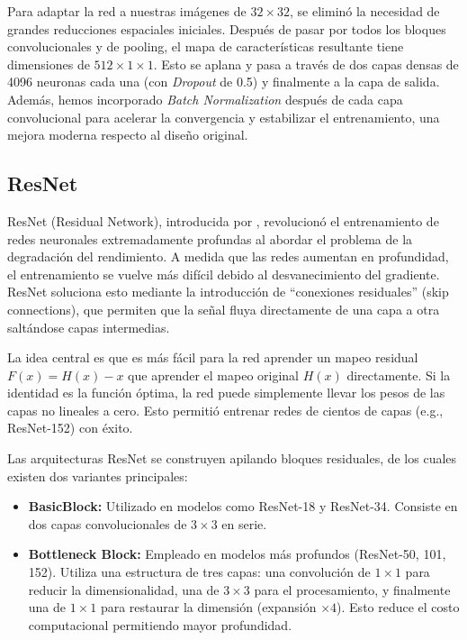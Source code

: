 \documentclass{pas}
\begin{document}
Para adaptar la red a nuestras imágenes de $32 \times 32$, se eliminó la necesidad de grandes reducciones espaciales iniciales. Después de pasar por todos los bloques convolucionales y de pooling, el mapa de características resultante tiene dimensiones de $512 \times 1 \times 1$. Esto se aplana y pasa a través de dos capas densas de 4096 neuronas cada una (con \textit{Dropout} de 0.5) y finalmente a la capa de salida. Además, hemos incorporado \textit{Batch Normalization} después de cada capa convolucional para acelerar la convergencia y estabilizar el entrenamiento, una mejora moderna respecto al diseño original.

\subsection{ResNet}

ResNet (Residual Network), introducida por \cite{he2016deep}, revolucionó el entrenamiento de redes neuronales extremadamente profundas al abordar el problema de la degradación del rendimiento. A medida que las redes aumentan en profundidad, el entrenamiento se vuelve más difícil debido al desvanecimiento del gradiente. ResNet soluciona esto mediante la introducción de ``conexiones residuales'' (skip connections), que permiten que la señal fluya directamente de una capa a otra saltándose capas intermedias.

La idea central es que es más fácil para la red aprender un mapeo residual $F(x) = H(x) - x$ que aprender el mapeo original $H(x)$ directamente. Si la identidad es la función óptima, la red puede simplemente llevar los pesos de las capas no lineales a cero. Esto permitió entrenar redes de cientos de capas (e.g., ResNet-152) con éxito.

Las arquitecturas ResNet se construyen apilando bloques residuales, de los cuales existen dos variantes principales:
\begin{itemize}
    \item \textbf{BasicBlock:} Utilizado en modelos como ResNet-18 y ResNet-34. Consiste en dos capas convolucionales de $3 \times 3$ en serie.
    \item \textbf{Bottleneck Block:} Empleado en modelos más profundos (ResNet-50, 101, 152). Utiliza una estructura de tres capas: una convolución de $1 \times 1$ para reducir la dimensionalidad, una de $3 \times 3$ para el procesamiento, y finalmente una de $1 \times 1$ para restaurar la dimensión (expansión $\times 4$). Esto reduce el costo computacional permitiendo mayor profundidad.
\end{itemize}
\end{document}
